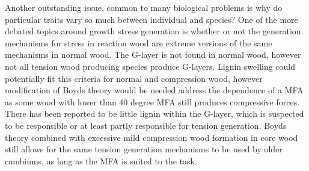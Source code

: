 Another outstanding issue, common to many biological problems is why do
particular traits vary so much between individual and species? One of the
more debated topics around growth stress generation is whether or not the generation
mechanisms for stress in reaction wood are extreme versions of the same
mechanisms in normal wood. The G-layer is not found in normal wood, however not
all tension wood producing species produce G-layers. Lignin swelling could
potentially fit this criteria for normal and compression wood, however
modification of Boyds theory would be needed address the dependence of a MFA
as some wood with lower than 40 degree MFA still produces compressive forces.
There has been reported to be little lignin within the G-layer, which is
suspected to be responsible or at least partly responsible for tension
generation. Boyds theory combined with excessive mild compression wood
formation in core wood still allows for the same tension generation mechanisms
to be used by older cambiums, as long as the MFA is suited to the task.